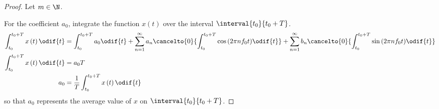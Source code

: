 \documentclass{article}
\begin{document}
\begin{proof}
    Let \(m \in \N\).

    For the coefficient \(a_0\), integrate the function \(x\left( t \right)\) over the interval \(\interval{t_0}{t_0 + T}\).
    \begin{align*}
        \int_{t_0}^{t_0 + T} x\left( t \right) \odif{t} & = \int_{t_0}^{t_0 + T} a_0 \odif{t} + \sum_{n = 1}^\infty a_n \cancelto{0}{\int_{t_0}^{t_0 + T} \cos{\left( 2 \pi n f_0 t \right)} \odif{t}} + \sum_{n = 1}^\infty b_n \cancelto{0}{\int_{t_0}^{t_0 + T} \sin{\left( 2 \pi n f_0 t \right)} \odif{t}} \\
        \int_{t_0}^{t_0 + T} x\left( t \right) \odif{t} & = a_0 T                                                                                                                                                                                                                                               \\
        a_0                                             & = \frac{1}{T} \int_{t_0}^{t_0 + T} x\left( t \right) \odif{t}
    \end{align*}
    so that \(a_0\) represents the average value of \(x\) on \(\interval{t_0}{t_0 + T}\).


\end{proof}
\end{document}
